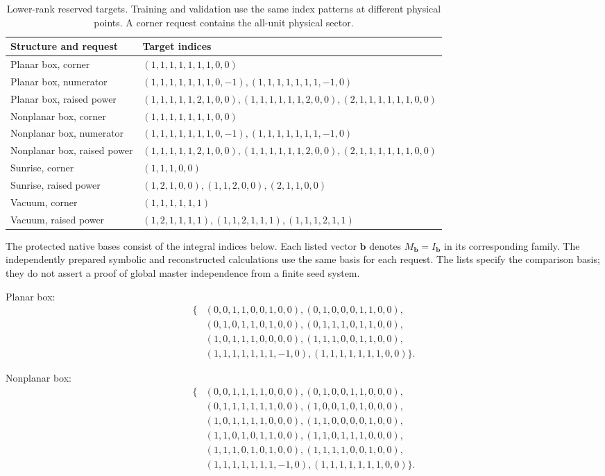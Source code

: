 \begin{table}[!htbp]\centering\small
\caption{Lower-rank reserved targets. Training and validation use the same index patterns at different physical points. A corner request contains the all-unit physical sector.}
\label{tab:reconstruction-low-targets}
\begin{tabularx}{\linewidth}{@{}lY@{}}\toprule
Structure and request & Target indices\\\midrule
Planar box, corner & $(1,1,1,1,1,1,1,0,0)$ \\
Planar box, numerator & $(1,1,1,1,1,1,1,0,-1), (1,1,1,1,1,1,1,-1,0)$ \\
Planar box, raised power & $(1,1,1,1,1,2,1,0,0), (1,1,1,1,1,1,2,0,0), (2,1,1,1,1,1,1,0,0)$ \\
Nonplanar box, corner & $(1,1,1,1,1,1,1,0,0)$ \\
Nonplanar box, numerator & $(1,1,1,1,1,1,1,0,-1), (1,1,1,1,1,1,1,-1,0)$ \\
Nonplanar box, raised power & $(1,1,1,1,1,2,1,0,0), (1,1,1,1,1,1,2,0,0), (2,1,1,1,1,1,1,0,0)$ \\
Sunrise, corner & $(1,1,1,0,0)$ \\
Sunrise, raised power & $(1,2,1,0,0), (1,1,2,0,0), (2,1,1,0,0)$ \\
Vacuum, corner & $(1,1,1,1,1,1)$ \\
Vacuum, raised power & $(1,2,1,1,1,1), (1,1,2,1,1,1), (1,1,1,2,1,1)$ \\
\bottomrule\end{tabularx}\end{table}

The protected native bases consist of the integral indices below. Each listed vector $\boldsymbol b$ denotes $M_{\boldsymbol b}=I_{\boldsymbol b}$ in its corresponding family. The independently prepared symbolic and reconstructed calculations use the same basis for each request. The lists specify the comparison basis; they do not assert a proof of global master independence from a finite seed system.

Planar box:\[\begin{aligned}\{&(0,0,1,1,0,0,1,0,0),(0,1,0,0,0,1,1,0,0),\\&(0,1,0,1,1,0,1,0,0),(0,1,1,1,0,1,1,0,0),\\&(1,0,1,1,1,0,0,0,0),(1,1,1,0,0,1,1,0,0),\\&(1,1,1,1,1,1,1,-1,0),(1,1,1,1,1,1,1,0,0)\}.\end{aligned}\]

Nonplanar box:\[\begin{aligned}\{&(0,0,1,1,1,1,0,0,0),(0,1,0,0,1,1,0,0,0),\\&(0,1,1,1,1,1,1,0,0),(1,0,0,1,0,1,0,0,0),\\&(1,0,1,1,1,1,0,0,0),(1,1,0,0,0,0,1,0,0),\\&(1,1,0,1,0,1,1,0,0),(1,1,0,1,1,1,0,0,0),\\&(1,1,1,0,1,0,1,0,0),(1,1,1,1,0,0,1,0,0),\\&(1,1,1,1,1,1,1,-1,0),(1,1,1,1,1,1,1,0,0)\}.\end{aligned}\]

